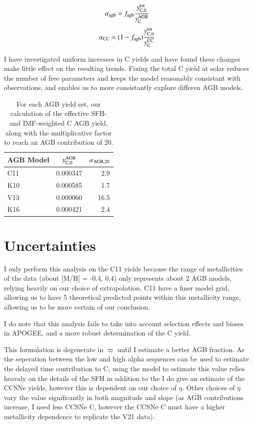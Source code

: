 \documentclass[12pt,oneside]{report}
\newcommand{\Ycc}{\ensuremath{y_{\rm C}^{\rm CC}}}
\newcommand{\Yct}{\ensuremath{y_{\rm C, 0}^{\rm tot}}}
\newcommand{\Ycagb}{\ensuremath{y_{\rm C}^{\rm AGB}}}
\begin{document}
\begin{equation}
    \alpha_{\rm agb} = f_{\rm agb} \frac{\Yct}{\Ycagb}
\end{equation}
\begin{equation}
    \alpha_{\rm CC} = (1 - f_{\rm agb}) \frac{\Yct}{\Ycc}
\end{equation}

I have investigated uniform increases in C yields and have found these changes make little effect on the resulting trends. Fixing the total C yield at solar reduces the number of free parameters and keeps the model reasonably consistant with observations, and enables us to more consistantly explore differen AGB models. 


\begin{table}
	\centering
    \caption[AGB net solar IMF yields]{For each AGB yield set, our calculation of the effective SFH- and IMF-weighted C AGB yield, along with the multiplicative factor to reach an AGB contribution of 20.}
	\label{tab:alpha_agb}
	\begin{tabular}{lcr} %
		\toprule 
		AGB Model & $y_{\rm C, 0}^{\rm AGB}$ & $\alpha_{\rm AGB, 20}$\\
        \midrule
		C11 & 0.000347 & 2.9\\
		K10 & 0.000585 & 1.7\\
		V13 & 0.000060 & 16.5\\
		K16 & 0.000421 & 2.4\\
		\bottomrule
	\end{tabular}
\end{table}


\section{Uncertainties}

I only perform this analysis on the C11 yields because the range of metallicities of the data (about [M/H] = -0.4, 0.4) only represents about 2 AGB models, relying heavily on our choice of extrapolation. C11 have a finer model grid, allowing us to have 5 theoretical predicted points within this metallicity range, allowing us to be more certain of our conclusion. 

I do note that this analysis fails to take into account selection effects and biases in APOGEE, and a more robust determination of the C yield. 


This formulation is degenerate in $\varpi$ until I estimate a better AGB fraction. As the seperation between the low and high alpha sequences can be used to estimate the delayed time contribution to C, using the model to estimate this value relies heavaly on the details of the SFH in addition to the 
I do give an estimate of the CCSNe yields, however this is dependent on our choice of $\eta$. Other choices of $\eta$ vary the value significantly in both magnitude and slope (as AGB contributions increase, I need less CCSNe C, however the CCSNe C must have a higher metallicity dependence to replicate the V21 data). 
\end{document}

